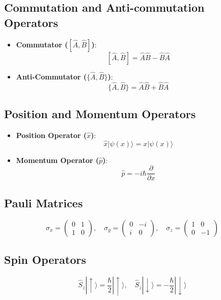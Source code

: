 \documentclass{article}
\theoremstyle{plain}
\begin{document}
\subsection{Commutation and Anti-commutation Operators}
\begin{itemize}
    \item \textbf{Commutator (\([\hat{A}, \hat{B}]\))}:
    \[
    [\hat{A}, \hat{B}] = \hat{A} \hat{B} - \hat{B} \hat{A}
    \]

    \item \textbf{Anti-Commutator (\(\{\hat{A}, \hat{B}\}\))}:
    \[
    \{\hat{A}, \hat{B}\} = \hat{A} \hat{B} + \hat{B} \hat{A}
    \]
\end{itemize}

\subsection{Position and Momentum Operators}
\begin{itemize}
    \item \textbf{Position Operator (\(\hat{x}\))}:
    \[
    \hat{x} |\psi(x)\rangle = x |\psi(x)\rangle
    \]

    \item \textbf{Momentum Operator (\(\hat{p}\))}:
    \[
    \hat{p} = -i\hbar \frac{\partial}{\partial x}
    \]
\end{itemize}

\subsection{Pauli Matrices}
\[
\sigma_x = \begin{pmatrix} 0 & 1 \\ 1 & 0 \end{pmatrix}, \quad
\sigma_y = \begin{pmatrix} 0 & -i \\ i & 0 \end{pmatrix}, \quad
\sigma_z = \begin{pmatrix} 1 & 0 \\ 0 & -1 \end{pmatrix}
\]

\subsection{Spin Operators}
\[
\hat{S}_z |\uparrow\rangle = \frac{\hbar}{2} |\uparrow\rangle, \quad
\hat{S}_z |\downarrow\rangle = -\frac{\hbar}{2} |\downarrow\rangle
\]
\end{document}
